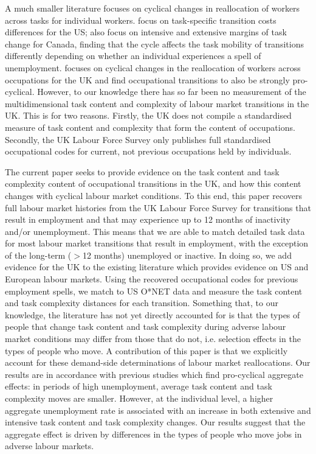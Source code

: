 \documentclass[12pt,authoryear]{elsarticle}
\begin{document}
	\vspace{2mm}	  
			  
	A much smaller literature focuses on cyclical changes in reallocation of workers across tasks for individual workers. \cite{CortesGallipoli} focus on task-specific transition costs differences for the US; \cite{Summerfield2016} also focus on intensive and extensive margins of task change for Canada, finding that the cycle affects the task mobility of transitions differently depending on whether an individual experiences a spell of unemployment. \cite{Carrillo-Tudela2016} focuses on cyclical changes in the reallocation of workers across occupations for the UK and find occupational transitions to also be strongly pro-cyclical. However, to our knowledge there has so far been no measurement of the multidimensional task content and complexity of labour market transitions in the UK. This is for two reasons. Firstly, the UK does not compile a standardised measure of task content and complexity that form the content of occupations. Secondly, the UK Labour Force Survey only publishes full standardised occupational codes for current, not previous occupations held by individuals. 
	
		\vspace{2mm}	  
	
	The current paper seeks to provide evidence on the task content and task complexity content of occupational transitions in the UK, and how this content changes with cyclical labour market conditions. To this end, this paper recovers full labour market histories from the UK Labour Force Survey for transitions that result in employment and that may experience up to 12 months of inactivity and/or unemployment. This means that we are able to match detailed task data for most labour market transitions that result in employment, with the exception of the long-term ($>$12 months) unemployed or inactive. In doing so, we add evidence for the UK to the existing literature which provides evidence on US and European labour markets.  Using the recovered occupational codes for previous employment spells, we match to US O*NET data and measure the task content and task complexity distances for each transition. Something that, to our knowledge, the literature has not yet directly accounted for is that the types of people that change task content and task complexity during adverse labour market conditions may differ from those that do not, i.e. selection effects in the types of people who move. A contribution of this paper is that we explicitly account for these demand-side determinations of labour market reallocations. Our results are in accordance with previous studies which find pro-cyclical aggregate effects: in periods of high unemployment, average task content and task complexity moves are smaller. However, at the individual level, a higher aggregate unemployment rate is associated with an increase in both extensive and intensive task content and task complexity changes. Our results suggest that the aggregate effect is driven by differences in the types of people who move jobs in adverse labour markets.
\end{document}
